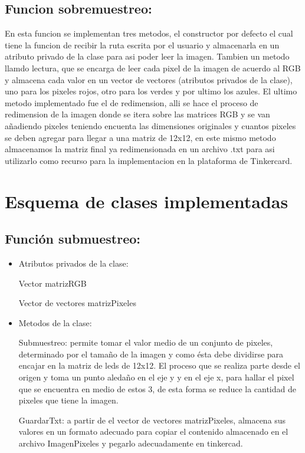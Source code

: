 \documentclass{article}
\begin{document}
\subsection{Funcion sobremuestreo:}
En esta funcion se implementan tres metodos, el constructor por defecto el cual tiene la funcion de recibir la ruta escrita por el usuario y almacenarla en un atributo privado de la clase para asi poder leer la imagen. Tambien un metodo llamdo lectura, que se encarga de leer cada pixel de la imagen de acuerdo al RGB y almacena cada valor en un vector de vectores (atributos privados de la clase), uno para los pixeles rojos, otro para los verdes y por ultimo los azules. El ultimo metodo implementado fue el de redimension, alli se hace el proceso de redimension de la imagen donde se itera sobre las matrices RGB y se van añadiendo pixeles teniendo encuenta las dimensiones originales y cuantos pixeles se deben agregar para llegar a una matriz de 12x12, en este mismo metodo almacenamos la matriz final ya redimensionada en un archivo .txt para asi utilizarlo como recurso para la implementacion en la plataforma de Tinkercard.


\section{Esquema de clases implementadas}
\subsection{Función submuestreo: }

\begin{itemize}
\item Atributos privados de la clase:

\hspace{0.5cm}Vector matrizRGB

\hspace{0.5cm}Vector de vectores matrizPixeles

\item Metodos de la clase:

\hspace{0.5cm}Submuestreo: permite tomar el valor medio de un conjunto de pixeles, determinado por el tamaño de la imagen y como ésta debe dividirse para encajar en la matriz de leds de 12x12. El proceso que se realiza parte desde el origen y toma un punto aledaño en el eje y y en el eje x, para hallar el pixel que se encuentra en medio de estos 3, de esta forma se reduce la cantidad de pixeles que tiene la imagen. 

\hspace{0.5cm}GuardarTxt: a partir de el vector de vectores matrizPixeles, almacena sus valores en un formato adecuado para copiar el contenido almacenado en el archivo ImagenPixeles y pegarlo adecuadamente en tinkercad.


\end{itemize}
\end{document}
